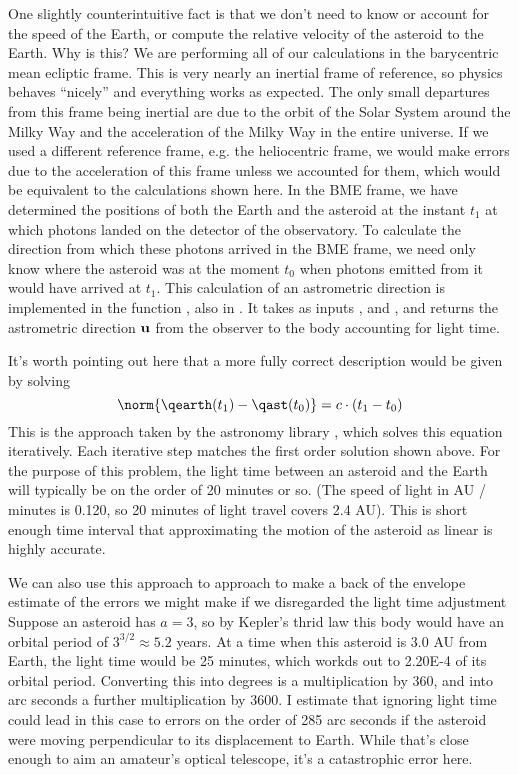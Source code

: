 One slightly counterintuitive fact is that we don't need to know or account for the speed of the Earth, 
or compute the relative velocity of the asteroid to the Earth. 
Why is this?
We are performing all of our calculations in the barycentric mean ecliptic frame.
This is very nearly an inertial frame of reference, so physics behaves ``nicely'' and everything works as expected.
The only small departures from this frame being inertial are due to the orbit of the Solar System around the Milky Way
and the acceleration of the Milky Way in the entire universe.
If we used a different reference frame, e.g. the heliocentric frame, we would make errors due to the acceleration of this frame 
unless we accounted for them, which would be equivalent to the calculations shown here.
In the BME frame, we have determined the positions of both the Earth and the asteroid at the instant $t_1$ at which 
photons landed on the detector of the observatory.
To calculate the direction from which these photons arrived in the BME frame, we need only know where the asteroid was at the moment
$t_0$ when photons emitted from it would have arrived at $t_1$.
This calculation of an astrometric direction is implemented in the function , also in .
It takes as inputs ,  and , and returns the astrometric direction $\mathbf{u}$
from the observer to the body accounting for light time.

It's worth pointing out here that a more fully correct description would be given by solving
$$ \norm{\qearth(t_1) - \qast(t_0)} = c \cdot (t_1 - t_0) $$
This is the approach taken by the astronomy library , which solves this equation iteratively.
Each iterative step matches the first order solution shown above.
For the purpose of this problem, the light time between an asteroid and the Earth will typically be on the order of 20 minutes or so.
(The speed of light in AU / minutes is 0.120, so 20 minutes of light travel covers 2.4 AU).
This is short enough time interval that approximating the motion of the asteroid as linear is highly accurate.

We can also use this approach to approach to make a back of the envelope estimate of the errors we might make if 
we disregarded the light time adjustment
Suppose an asteroid has $a=3$, so by Kepler's thrid law this body would have an orbital period of $3^{3/2} \approx 5.2$ years.
At a time when this asteroid is 3.0 AU from Earth, the light time would be 25 minutes, which workds out to 2.20E-4 of its orbital period.
Converting this into degrees is a multiplication by 360, and into arc seconds a further multiplication by 3600.
I estimate that ignoring light time could lead in this case to errors on the order of 285 arc seconds 
if the asteroid were moving perpendicular to its displacement to Earth.
While that's close enough to aim an amateur's optical telescope, it's a catastrophic error here.

